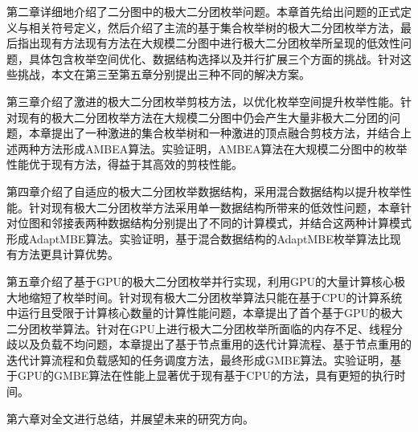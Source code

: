 第二章详细地介绍了二分图中的极大二分团枚举问题。本章首先给出问题的正式定义与相关符号定义，然后介绍了主流的基于集合枚举树的极大二分团枚举方法，最后指出现有方法现有方法在大规模二分图中进行极大二分团枚举所呈现的低效性问题，具体包含枚举空间优化、数据结构选择以及并行扩展三个方面的挑战。针对这些挑战，本文在第三至第五章分别提出三种不同的解决方案。

第三章介绍了激进的极大二分团枚举剪枝方法，以优化枚举空间提升枚举性能。针对现有的极大二分团枚举方法在大规模二分图中仍会产生大量非极大二分团的问题，本章提出了一种激进的集合枚举树和一种激进的顶点融合剪枝方法，并结合上述两种方法形成AMBEA算法。实验证明，AMBEA算法在大规模二分图中的枚举性能优于现有方法，得益于其高效的剪枝性能。

第四章介绍了自适应的极大二分团枚举数据结构，采用混合数据结构以提升枚举性能。针对现有极大二分团枚举方法采用单一数据结构所带来的低效性问题，本章针对位图和邻接表两种数据结构分别提出了不同的计算模式，并结合这两种计算模式形成AdaptMBE算法。实验证明，基于混合数据结构的AdaptMBE枚举算法比现有方法更具计算优势。

第五章介绍了基于GPU的极大二分团枚举并行实现，利用GPU的大量计算核心极大地缩短了枚举时间。针对现有极大二分团枚举算法只能在基于CPU的计算系统中运行且受限于计算核心数量的计算性能问题，本章提出了首个基于GPU的极大二分团枚举算法。针对在GPU上进行极大二分团枚举所面临的内存不足、线程分歧以及负载不均问题，本章提出了基于节点重用的迭代计算流程、基于节点重用的迭代计算流程和负载感知的任务调度方法，最终形成GMBE算法。实验证明，基于GPU的GMBE算法在性能上显著优于现有基于CPU的方法，具有更短的执行时间。

第六章对全文进行总结，并展望未来的研究方向。



